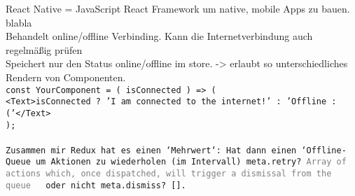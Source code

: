   React Native = JavaScript React Framework um native, mobile Apps zu bauen. blabla\\
  Behandelt online/offline Verbinding. Kann die Internetverbindung auch regelmäßig prüfen\\
  Speichert nur den Status online/offline im store. -> erlaubt so unterschiedliches Rendern von Componenten.\\

\tt{const YourComponent = ({ isConnected }) => (\\
  <Text>{isConnected ? 'I am connected to the internet!' : 'Offline :('}</Text>\\
);\\}\\
Zusammen mir Redux hat es einen `Mehrwert`:
Hat dann einen `Offline-\gls{Queue} um Aktionen zu wiederholen (im Intervall) \tt{meta.retry? \textcolor{gray}  {Array of actions which, once dispatched, will trigger a dismissal from the queue}} ~ oder nicht \tt{meta.dismiss? []}.\cite{rn-offline-gh}

